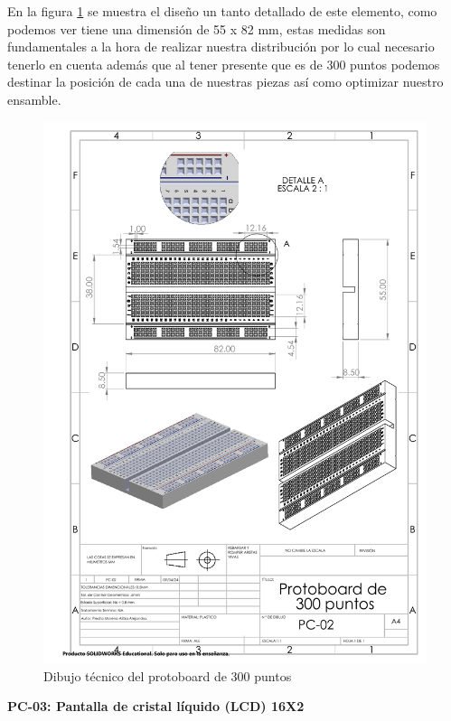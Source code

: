     En la figura \ref{fig:proto} se muestra el diseño un tanto detallado de este elemento, como podemos ver tiene una dimensión de 55 x 82 mm, estas medidas son fundamentales a la hora de realizar nuestra distribución por lo cual necesario tenerlo en cuenta además que al tener presente que es de 300 puntos podemos destinar la posición de cada una de nuestras piezas así como optimizar nuestro ensamble.
    
    \begin{figure}[H]
        \centering
        \includegraphics[trim = {20mm 145mm 10mm 50mm},clip,scale=0.4]{22/Img/protoDibujo.pdf}
        \caption{Dibujo técnico del protoboard de 300 puntos}
        \label{fig:proto}
    \end{figure}
    
    \textbf{PC-03: Pantalla de cristal líquido (LCD) 16X2}
    

